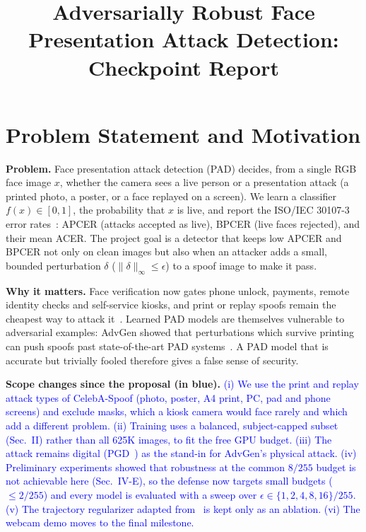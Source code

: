 \documentclass[conference]{IEEEtran}
\newcommand{\scope}[1]{\textcolor{blue}{#1}}
\begin{document}
\title{Adversarially Robust Face Presentation Attack Detection:\\ Checkpoint Report}
\author{
}
\maketitle

\section{Problem Statement and Motivation}
\textbf{Problem.} Face presentation attack detection (PAD) decides, from a single RGB face image $x$, whether the
camera sees a live person or a presentation attack (a printed photo, a poster, or a face replayed on a screen).
We learn a classifier $f(x)\in[0,1]$, the probability that $x$ is live, and report the ISO/IEC 30107-3
error rates~\cite{iso30107}: APCER (attacks accepted as live), BPCER (live faces rejected), and their mean ACER.
The project goal is a detector that keeps low APCER and BPCER not only on clean images but also when an attacker
adds a small, bounded perturbation $\delta$ ($\|\delta\|_\infty\le\epsilon$) to a spoof image to make it pass.

\textbf{Why it matters.} Face verification now gates phone unlock, payments, remote identity checks and
self-service kiosks, and print or replay spoofs remain the cheapest way to attack it~\cite{yu2023survey}.
Learned PAD models are themselves vulnerable to adversarial examples: AdvGen showed that
perturbations which survive printing can push spoofs past state-of-the-art PAD systems~\cite{patnaik2023advgen}.
A PAD model that is accurate but trivially fooled therefore gives a false sense of security.

\textbf{Scope changes since the proposal (in blue).}
\scope{(i) We use the print and replay attack types of CelebA-Spoof (photo, poster, A4 print, PC, pad and phone
screens) and exclude masks, which a kiosk camera would face rarely and which add a different problem.
(ii) Training uses a balanced, subject-capped subset (Sec.~II) rather than all 625K images, to fit the free GPU
budget. (iii) The attack remains digital (PGD~\cite{madry2018pgd}) as the stand-in for AdvGen's physical attack.
(iv) Preliminary experiments showed that robustness at the common $8/255$ budget is not achievable here
(Sec.~IV-E), so the defense now targets small budgets ($\le 2/255$) and every model is evaluated with a sweep
over $\epsilon\in\{1,2,4,8,16\}/255$. (v) The trajectory regularizer adapted from~\cite{sun2023sa} is kept only as
an ablation. (vi) The webcam demo moves to the final milestone.}
\end{document}
